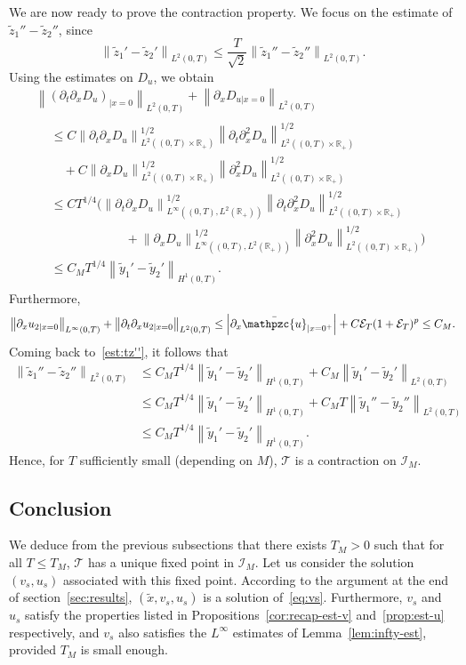 \documentclass[AHL,Unicode,longabstracts,published]{cedram}
\newcommand{\R}{\mathbb{R}}
\newcommand{\p}{\partial}
\newcommand{\bu}{\bar{\mathpzc{u}}}
\newcommand{\cE}{\mathcal E}
\newcommand{\cT}{\mathcal T}
\newcommand{\cI}{\mathcal I}
\newcommand{\tx}{\widetilde{x}}
\newcommand{\ty}{\widetilde{y}}
\newcommand{\tz}{\widetilde{z}}
\newcommand{\du}{D_u}
\newcommand{\tx}{\widetilde{x}}
\begin{document}
We are now ready to prove the contraction property. We focus on the estimate of $\tz_1''-\tz_2''$, since
\[
\left\|\tz_1'-\tz_2'\right\|_{L^2(0,T)}\leq \frac{T}{\sqrt{2}}\left\|\tz_1''-\tz_2''\right\|_{L^2(0,T)}.
\]
Using the estimates on $\du$, we obtain
\begin{multline*}
\left\|\left(\p_t \p_x \du\right)_{|x=0}\right\|_{L^2(0,T)} + \left\| \p_x D_{u|x=0}\right\|_{L^2(0,T)}\\
\begin{aligned}
&\leq C\left\|\p_t \p_x \du\right\|_{L^2\left((0,T)\times \R_+\right) }^{1/2} \left\|\p_t \p_x^2 \du\right\|_{L^2\left((0,T)\times \R_+\right)}^{1/2} 
\\
&\quad + C \left\| \p_x \du\right\|_{L^2\left((0,T)\times \R_+\right)}^{1/2}\left\| \p_x^2 \du\right\|_{L^2\left((0,T)\times \R_+\right)}^{1/2} \\
&\leq CT^{1/4} \Big(\left\|\p_t \p_x \du\right\|_{L^\infty\left((0,T), L^2(\R_+)\right)}^{1/2} \left\|\p_t \p_x^2 \du\right\|_{L^2\left((0,T)\times \R_+\right)}^{1/2}\\
&\qquad\qquad\qquad + \left\| \p_x \du\right\|_{L^\infty\left((0,T), L^2(\R_+)\right)}^{1/2}\left\| \p_x^2 \du\right\|_{L^2\left((0,T)\times \R_+\right)}^{1/2} \Big)\\
&\leq C_M T^{1/4} \left\|\ty_1'-\ty_2'\right\|_{H^1(0,T)}.
\end{aligned}
\end{multline*}
Furthermore,
\[
\left\|\p_x u_{2|x=0}\right\|_{L^\infty(0,T)} + \left\|\p_t \p_x u_{2|x=0}\right\|_{L^2(0,T)}
\leq \left|\p_x \bu_{|x=0^+}\right| + C\cE_T (1 + \cE_T)^p
\leq C_M.
\]
Coming back to~\eqref{est:tz''}, it follows that
\begin{align*}
\left\|\tz_1''-\tz_2''\right\|_{L^2(0,T)} & \leq C_M T^{1/4}\left\|\ty_1'-\ty_2'\right\|_{H^1(0,T)} + C_M \left\|\ty_1'-\ty_2'\right\|_{L^2(0,T)} \\
& \leq C_M T^{1/4}\left\|\ty_1'-\ty_2'\right\|_{H^1(0,T)} + C_M T \left\|\ty_1''-\ty_2''\right\|_{L^2(0,T)} \\
& \leq C_M T^{1/4}\left\|\ty_1'-\ty_2'\right\|_{H^1(0,T)}.
\end{align*}
Hence, for $T$ sufficiently small (depending on $M$), $\cT$ is a contraction on $\cI_M$.

\subsection{Conclusion}

We deduce from the previous subsections that there exists $T_M>0$ such that for all $T\leq T_M$, $\cT$ has a unique fixed point in $\cI_M$. Let us consider the solution $(v_s, u_s)$ associated with this fixed point. According to the argument at the end of section~\ref{sec:results}, $(\tx, v_s, u_s)$ is a solution of~\eqref{eq:vs}. Furthermore, $v_s$ and $u_s$ satisfy the properties listed in Propositions~\ref{cor:recap-est-v} and~\ref{prop:est-u} respectively, and $v_s$ also satisfies the $L^\infty$ estimates of Lemma~\ref{lem:infty-est}, provided $T_M$ is small enough.
\end{document}

